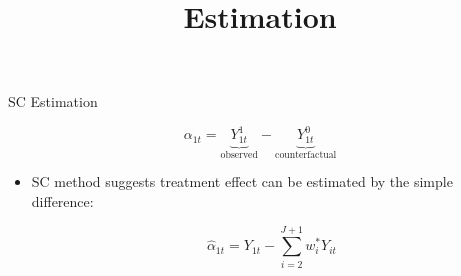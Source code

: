 \documentclass[dvipsnames,hyperref={pdfpagelabels=false}]{beamer}
\begin{document}
\title[]  
{Estimation}


\author 
{}

\institute{}






\date
{}


\begin{frame}{}
\titlepage
\end{frame}




\begin{frame}{SC Estimation}




\begin{equation*}
\alpha_{1t}=\underbrace{Y^1_{1t}}_{\text{observed}}-\underbrace{Y^0_{1t}}_{\text{counterfactual}}
\end{equation*}	
\begin{itemize}
\item SC method suggests treatment effect can be estimated by the simple difference:

\begin{equation*}
\hat{\alpha}_{1t}=Y_{1t}-\sum^{J+1}_{i=2}w^*_{i}Y_{it}
\end{equation*}
	

\end{itemize}
\end{frame}
\end{document}
